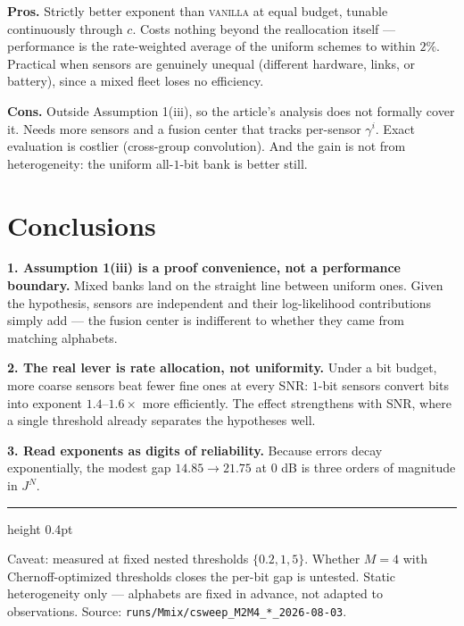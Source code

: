 \documentclass[10pt,a4paper]{article}
\newcommand{\van}{\textsc{vanilla}}
\begin{document}
\textbf{Pros.} Strictly better exponent than \van{} at equal budget,
tunable continuously through $c$. Costs nothing beyond the
reallocation itself --- performance is the rate-weighted average of
the uniform schemes to within $2\%$. Practical when sensors are
genuinely unequal (different hardware, links, or battery), since a
mixed fleet loses no efficiency.

\textbf{Cons.} Outside Assumption 1(iii), so the article's analysis
does not formally cover it. Needs more sensors and a fusion center
that tracks per-sensor $\gamma^i$. Exact evaluation is costlier
(cross-group convolution). And the gain is not from heterogeneity:
the uniform all-$1$-bit bank is better still.

\section*{Conclusions}

\textbf{1. Assumption 1(iii) is a proof convenience, not a
performance boundary.} Mixed banks land on the straight line between
uniform ones. Given the hypothesis, sensors are independent and their
log-likelihood contributions simply add --- the fusion center is
indifferent to whether they came from matching alphabets.

\textbf{2. The real lever is rate allocation, not uniformity.} Under
a bit budget, more coarse sensors beat fewer fine ones at every SNR:
$1$-bit sensors convert bits into exponent $1.4$--$1.6\times$ more
efficiently. The effect strengthens with SNR, where a single
threshold already separates the hypotheses well.

\textbf{3. Read exponents as digits of reliability.} Because errors
decay exponentially, the modest gap $14.85 \to 21.75$ at $0$ dB is
three orders of magnitude in $J^{N}$.

\vspace{2pt}
{\color{rule}\hrule height 0.4pt}
\vspace{3pt}
{\footnotesize\color{gray} Caveat: measured at fixed nested thresholds
$\{0.2,1,5\}$. Whether $M=4$ with Chernoff-optimized thresholds closes
the per-bit gap is untested. Static heterogeneity only --- alphabets
are fixed in advance, not adapted to observations. Source:
\texttt{runs/Mmix/csweep\_M2M4\_*\_2026-08-03}.}
\end{document}
